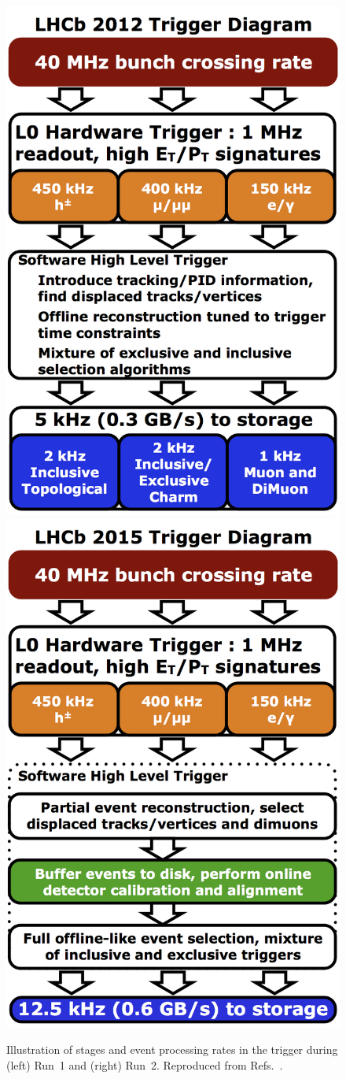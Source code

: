 \begin{figure}[tb]
    \centering
    \includegraphics[width=0.45\columnwidth]{figures/detector/Trigger_Run1.png}\hspace{1cm}
    \includegraphics[width=0.45\columnwidth]{figures/detector/Trigger_Run2.png}
    \caption{Illustration of stages and event processing rates in the \lhcb trigger during (left) Run~1 and (right) Run~2. Reproduced from Refs.~\cite{Trigger-Performance,Trigger-Performance2}.}
    \label{fig:trigger_stages}
\end{figure}

